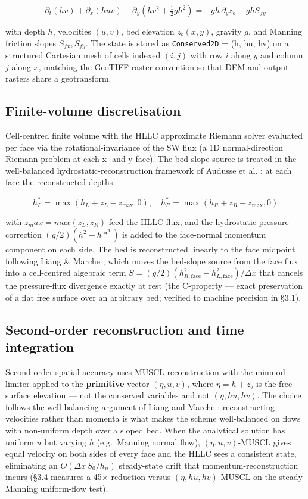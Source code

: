 \[\partial_t (hv) + \partial_x (huv) + \partial_y\!\left(hv^2 + \tfrac{1}{2}g h^2\right) = -g h\, \partial_y z_b - g h S_{fy}\]

with depth \(h\), velocities \((u, v)\), bed elevation \(z_b(x, y)\),
gravity \(g\), and Manning friction slopes \(S_{fx}, S_{fy}\). The state
is stored as \texttt{Conserved2D} = (h, hu, hv) on a structured
Cartesian mesh of cells indexed \((i, j)\) with row \(i\) along \(y\)
and column \(j\) along \(x\), matching the GeoTIFF raster convention so
that DEM and output rasters share a geotransform.

\subsection{Finite-volume
discretisation}

Cell-centred finite volume with the HLLC approximate Riemann solver
\citep{Toro1994, Toro2009} evaluated per face via the
rotational-invariance of the SW flux (a 1D normal-direction Riemann
problem at each x- and y-face). The bed-slope source is treated in the
well-balanced hydrostatic-reconstruction framework of Audusse et al.
\citep{Audusse2004}: at each face the reconstructed depths

\[h^*_L = \max(h_L + z_L - z_{\max}, 0), \quad h^*_R = \max(h_R + z_R - z_{\max}, 0)\]

with \(z_max = max(z_L, z_R)\) feed the HLLC flux, and the
hydrostatic-pressure correction \((g/2)(h^{2} - h*^{2})\) is added to
the face-normal momentum component on each side. The bed is
reconstructed linearly to the face midpoint following Liang \& Marche
\citep{LiangMarche2009}, which moves the bed-slope source from the face
flux into a cell-centred algebraic term
\(S = (g/2)(h^{2}_{R,\text{face}} - h^{2}_{L,\text{face}})/\Delta x\)
that cancels the pressure-flux divergence exactly at rest (the
C-property --- exact preservation of a flat free surface over an
arbitrary bed; verified to machine precision in §3.1).

\subsection{Second-order reconstruction and time
integration}

Second-order spatial accuracy uses MUSCL reconstruction with the minmod
limiter applied to the \textbf{primitive} vector \((\eta , u, v)\),
where \(\eta = h + z_b\) is the free-surface elevation --- not the
conserved variables and not \((\eta , hu, hv)\). The choice follows the
well-balancing argument of Liang and Marche \citep{LiangMarche2009}:
reconstructing velocities rather than momenta is what makes the scheme
well-balanced on flows with non-uniform depth over a sloped bed. When
the analytical solution has uniform \(u\) but varying \(h\)
(e.g.~Manning normal flow), \((\eta , u, v)\)-MUSCL gives equal velocity
on both sides of every face and the HLLC sees a consistent state,
eliminating an \(O(\Delta x\, S_0/h_n)\) steady-state drift that
momentum-reconstruction incurs (§3.4 measures a 45× reduction versus
\((\eta , hu, hv)\)-MUSCL on the steady Manning uniform-flow test).

